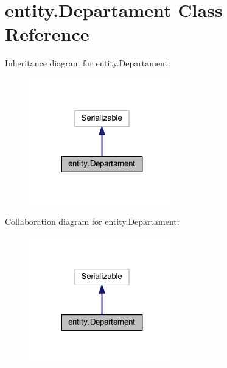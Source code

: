 \hypertarget{classentity_1_1_departament}{}\section{entity.\+Departament Class Reference}
\label{classentity_1_1_departament}


Inheritance diagram for entity.\+Departament\+:\nopagebreak
\begin{figure}[H]
\begin{center}
\leavevmode
\includegraphics[width=179pt]{classentity_1_1_departament__inherit__graph}
\end{center}
\end{figure}


Collaboration diagram for entity.\+Departament\+:\nopagebreak
\begin{figure}[H]
\begin{center}
\leavevmode
\includegraphics[width=179pt]{classentity_1_1_departament__coll__graph}
\end{center}
\end{figure}
